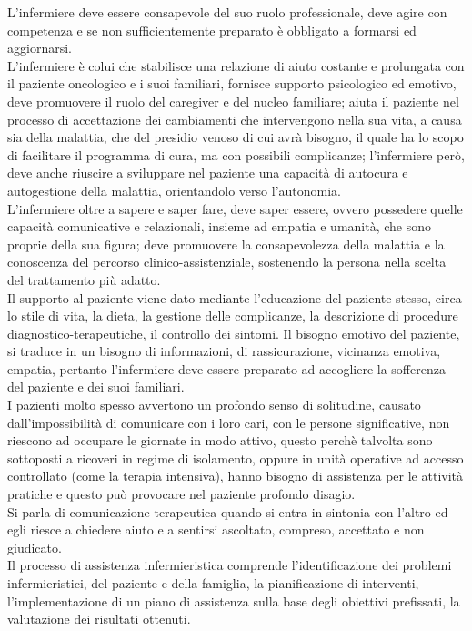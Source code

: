 L’infermiere deve essere consapevole del suo ruolo professionale, deve agire con competenza e se non 
sufficientemente preparato è obbligato a formarsi ed aggiornarsi.\\ 
L’infermiere è colui che stabilisce una relazione di aiuto costante e prolungata con il paziente oncologico e i suoi 
familiari, fornisce supporto psicologico ed emotivo, deve promuovere il ruolo del caregiver e del nucleo familiare; 
aiuta il paziente nel processo di accettazione dei cambiamenti 
che intervengono nella sua vita, a causa sia della malattia, che del presidio venoso di cui 
avrà bisogno, il quale ha lo scopo di facilitare il programma di cura, ma con possibili complicanze; l’infermiere però, 
deve anche riuscire a sviluppare nel paziente una capacità di autocura e autogestione della malattia, orientandolo 
verso l’autonomia.\\
L’infermiere oltre a sapere e saper fare, deve saper essere, ovvero possedere quelle capacità comunicative e 
relazionali, insieme ad empatia e umanità, che sono proprie della sua figura; deve promuovere la 
consapevolezza della malattia e la conoscenza del percorso clinico-assistenziale, sostenendo la persona nella 
scelta del trattamento più adatto\cite{COMUNICAZIONE}.\\
Il supporto al paziente viene dato mediante l’educazione del paziente stesso, circa lo stile di vita, la dieta, la 
gestione delle complicanze, la descrizione di procedure diagnostico-terapeutiche, il controllo dei sintomi. 
Il bisogno emotivo del paziente, si traduce in un bisogno di informazioni, di rassicurazione, vicinanza emotiva, 
empatia, pertanto l’infermiere deve essere preparato ad accogliere la sofferenza del paziente e dei suoi familiari.\\
I pazienti molto spesso avvertono un profondo senso di solitudine, causato dall’impossibilità di comunicare con i 
loro cari, con le persone significative, non riescono ad occupare le giornate in modo attivo, questo 
perchè talvolta sono sottoposti a ricoveri in regime di isolamento, oppure in unità operative ad accesso controllato 
(come la terapia intensiva), hanno bisogno di assistenza per le attività pratiche e questo può provocare 
nel paziente profondo disagio.\\
Si parla di comunicazione terapeutica quando si entra in sintonia con l’altro ed egli riesce a chiedere aiuto e a 
sentirsi ascoltato, compreso, accettato e non giudicato\cite{NURSE24}.\\
Il processo di assistenza infermieristica comprende l'identificazione dei problemi infermieristici, del paziente e 
della famiglia, la pianificazione di interventi, l’implementazione di un piano di assistenza sulla base degli 
obiettivi prefissati, la valutazione dei risultati ottenuti.
